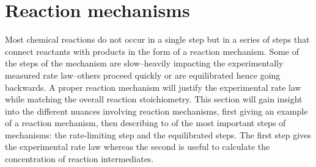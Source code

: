 \documentclass[main.tex]{subfiles}
\begin{document}
\section{Reaction mechanisms}
Most chemical reactions do not occur in a single step but in a series of steps that connect reactants with products in the form of a  reaction mechanism. Some of the steps of the mechanism are slow--heavily impacting the experimentally measured rate law--others proceed quickly or are equilibrated hence going backwards. A proper reaction mechanism will justify the experimental rate law while matching the overall reaction stoichiometry. This section will gain insight into the different nuances involving reaction mechanisms, first giving an example of a reaction mechanism, then describing to of the most important steps of mechanisms: the rate-limiting step and the equilibrated steps. The first step gives the experimental rate law whereas the second is useful to calculate the concentration of reaction intermediates.
\sloppy 
\end{document}
